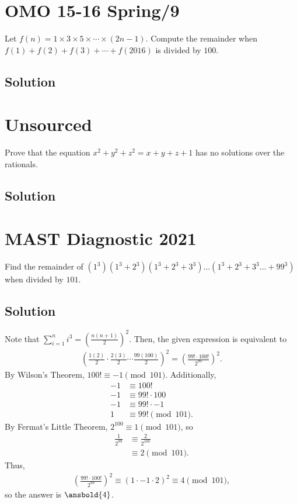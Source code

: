 \documentclass[mast]{lucky}
\begin{document}
\pagebreak\section{OMO 15-16 Spring/9}

Let $f(n)=1 \times 3 \times 5 \times \cdots \times (2n-1)$. Compute the remainder when $f(1)+f(2)+f(3)+\cdots +f(2016)$ is divided by $100.$

\subsection{Solution}

\pagebreak\section{Unsourced}

Prove that the equation $x^2+y^2+z^2=x+y+z+1$ has no solutions over the rationals.

\subsection{Solution}

\pagebreak\section{MAST Diagnostic 2021}

Find the remainder of $(1^3)(1^3+2^3)(1^3+2^3+3^3)\dots(1^3+2^3+3^3\dots+99^3)$ when divided by $101.$

\subsection{Solution}

Note that $\sum_{i=1}^{n} i^3 = \left(\frac{n(n + 1)}{2}\right)^2$. Then, the given expression is equivalent to 
\begin{align*}
\left(\frac{1(2)}{2} \cdot \frac{2(3)}{2} \cdots \frac{99(100)}{2}\right)^2 = \left(\frac{99! \cdot 100!}{2^{99}}\right)^2.
\end{align*}
By Wilson's Theorem, $100! \equiv -1 \pmod{101}$. Additionally,
\begin{align*}
-1 &\equiv 100! \\
-1 &\equiv 99! \cdot 100 \\
-1 &\equiv 99! \cdot -1 \\
1 &\equiv 99! \pmod{101}.
\end{align*}
By Fermat's Little Theorem, $2^{100} \equiv 1 \pmod{101}$, so
\begin{align*}
\frac{1}{2^{99}} &\equiv \frac{2}{2^{100}} \\
&\equiv 2 \pmod{101}.
\end{align*}
Thus, 
\begin{align*}
\left(\frac{99! \cdot 100!}{2^{99}}\right)^2 \equiv (1 \cdot -1 \cdot 2)^2 \equiv 4 \pmod{101},
\end{align*}
so the answer is $\ansbold{4}$.
\end{document}
